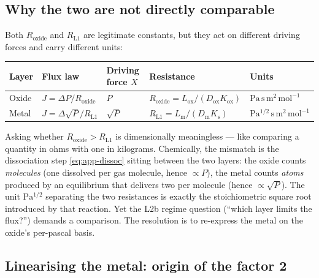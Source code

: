 \documentclass[11pt,a4paper]{article}
\newcommand{\Ks}{K_{\mathrm{s}}}
\newcommand{\Kox}{K_{\mathrm{ox}}}
\newcommand{\Dm}{D_{\mathrm{m}}}
\newcommand{\Dox}{D_{\mathrm{ox}}}
\newcommand{\Lm}{L_{\mathrm{m}}}
\newcommand{\Lox}{L_{\mathrm{ox}}}
\newcommand{\Rox}{R_{\mathrm{oxide}}}
\begin{document}
\subsection{Why the two are not directly comparable}

Both $\Rox$ and $R_{\mathrm{L1}}$ are legitimate constants, but they act on
different driving forces and carry different units:

\begin{center}
\begin{tabular}{lllll}
\toprule
Layer & Flux law & Driving force $X$ & Resistance & Units \\
\midrule
Oxide & $J = \Delta P/\Rox$ & $P$ & $\Rox = \Lox/(\Dox\Kox)$ & $\mathrm{Pa\,s\,m^2\,mol^{-1}}$ \\
Metal & $J = \Delta\sqrt{P}/R_{\mathrm{L1}}$ & $\sqrt{P}$ & $R_{\mathrm{L1}} = \Lm/(\Dm\Ks)$ & $\mathrm{Pa^{1/2}\,s\,m^2\,mol^{-1}}$ \\
\bottomrule
\end{tabular}
\end{center}

Asking whether $\Rox > R_{\mathrm{L1}}$ is dimensionally meaningless --- like
comparing a quantity in ohms with one in kilograms. Chemically, the mismatch
is the dissociation step \eqref{eq:app-dissoc} sitting between the two
layers: the oxide counts \emph{molecules} (one dissolved per gas molecule,
hence $\propto P$), the metal counts \emph{atoms} produced by an equilibrium
that delivers two per molecule (hence $\propto \sqrt{P}$). The unit
$\mathrm{Pa^{1/2}}$ separating the two resistances is exactly the
stoichiometric square root introduced by that reaction. Yet the L2b regime
question (``which layer limits the flux?'') demands a comparison. The
resolution is to re-express the metal on the oxide's per-pascal basis.

\subsection{Linearising the metal: origin of the factor 2}
\end{document}

